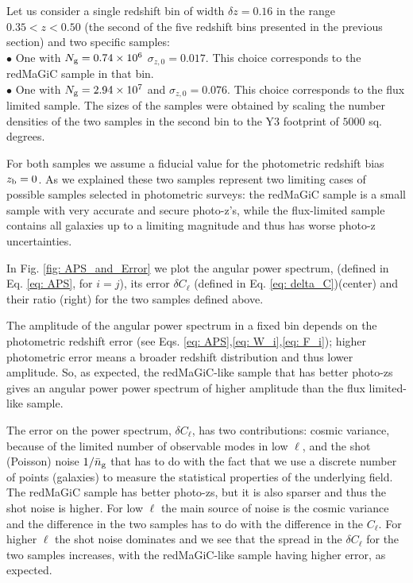 \documentclass[a4paper,fleqn,usenatbib]{mnras}
\begin{document}
Let us consider a single redshift bin of width $\delta z = 0.16$ in the range $0.35 < z < 0.50$ (the second of the five redshift bins presented in the previous section) and two specific samples:\\
$\bullet$ One with  $N_{\mbox{\scriptsize{g}}}= 0.74 \times 10^6$ $\sigma_{z,0} = 0.017$. This choice corresponds to the  redMaGiC sample in that bin.\\
$\bullet$ One with $N_{\mbox{\scriptsize{g}}}= 2.94 \times 10^7$ and $\sigma_{z,0} = 0.076$. This choice corresponds to the flux limited  sample.
The sizes of the samples were obtained by scaling the number densities of the two samples in the second bin to the Y3 footprint of $5000$ sq. degrees.


For both samples we assume a fiducial value for the photometric redshift bias $z_{\mbox{\scriptsize{b}}} = 0$. As we explained these two samples represent two limiting cases of possible samples selected in photometric surveys: the redMaGiC sample is a small sample with very accurate and secure photo-z's, while the flux-limited sample contains all galaxies up to a limiting magnitude and thus has worse photo-z uncertainties. 

 In Fig. \ref{fig: APS_and_Error} we plot the angular power spectrum, (defined in Eq. \ref{eq: APS}, for $i=j$), its error $\delta C_\ell$ (defined in Eq. \ref{eq: delta_C})(center) and their ratio (right) for the two samples defined above. 

The amplitude of the angular power spectrum in a fixed bin depends on the photometric redshift error (see Eqs. \ref{eq: APS},\ref{eq: W_i},\ref{eq: F_i}); higher photometric error means a broader redshift distribution and thus lower amplitude. So, as expected, the redMaGiC-like sample that has better photo-zs gives an angular power power spectrum of higher amplitude than the flux limited-like sample. 

The error on the power spectrum, $\delta C_{\ell}$, has two contributions: cosmic variance, because of the limited  number of observable modes in low $\ell$, and the shot (Poisson) noise $1/ \bar{n}_{\mbox{\scriptsize{g}}}$ that  has to do with the fact that we use a discrete number of points (galaxies) to measure the statistical properties of the underlying field. The redMaGiC sample has better photo-zs, but it is also sparser and thus the shot noise is higher. For low $\ell$ the main source of noise is the cosmic variance and the difference in the two samples has to do with the difference in the $C_\ell$. For higher $\ell$ the shot noise dominates and we see that  the spread in the $\delta C_{\ell}$ for the two samples increases, with the redMaGiC-like sample having higher error, as expected.  
\end{document}
